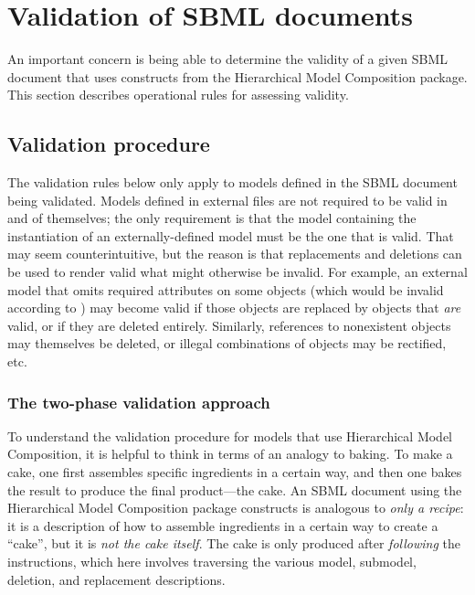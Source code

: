 
\section{Validation of SBML documents}
\label{apdx-validation}

An important concern is being able to determine the validity of a given SBML document that uses constructs from the Hierarchical Model Composition package. This section describes operational rules for assessing validity.


\subsection{Validation procedure}
\label{validation-procedure}

The validation rules below only apply to models defined in the SBML document being validated. Models defined in external files are not required to be valid in and of themselves; the only requirement is that the model containing the instantiation of an externally-defined model must be the one that is valid. That may seem counterintuitive, but the reason is that replacements and deletions can be used to render valid what might otherwise be invalid. For example, an external model that omits required attributes on some objects (which would be invalid according to \sbmlthreecore) may become valid if those objects are replaced by objects that \emph{are} valid, or if they are deleted entirely. Similarly, references to nonexistent objects may themselves be deleted, or illegal combinations of objects may be rectified, etc.


\subsubsection{The two-phase validation approach}

To understand the validation procedure for models that use Hierarchical Model Composition, it is helpful to think in terms of an analogy to baking. To make a cake, one first assembles specific ingredients in a certain way, and then one bakes the result to produce the final product---the cake. An SBML document using the Hierarchical Model Composition package constructs is analogous to \emph{only a recipe}: it is a description of how to assemble ingredients in a certain way to create a ``cake'', but it is \emph{not the cake itself}. The cake is only produced after \emph{following} the instructions, which here involves traversing the various model, submodel, deletion, and replacement descriptions.

